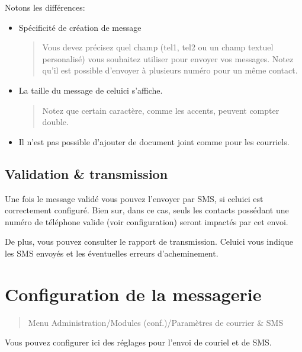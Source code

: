 \documentclass[letterpaper,10pt,french]{sphinxmanual}
\begin{document}
Notons les différences:
\begin{itemize}
\item {} 
Spécificité de création de message
\begin{quote}

Vous devez précisez quel champ (tel1, tel2 ou un champ textuel personalisé) vous souhaitez utiliser pour envoyer vos messages.
Notez qu’il est possible d’envoyer à plusieurs numéro pour un même contact.
\end{quote}

\item {} 
La taille du message de celui\sphinxhyphen{}ci s’affiche.
\begin{quote}

Notez que certain caractère, comme les accents, peuvent compter double.
\end{quote}

\item {} 
Il n’est pas possible d’ajouter de document joint comme pour les courriels.

\end{itemize}


\subsection{Validation \& transmission}
\label{\detokenize{mailing/sms:validation-transmission}}
Une fois le message validé vous pouvez l’envoyer par SMS, si celui\sphinxhyphen{}ci est correctement configuré.
Bien sur, dans ce cas, seuls les contacts possédant une numéro de téléphone valide (voir configuration) seront impactés par cet envoi.

De plus, vous pouvez consulter le rapport de transmission.
Celui\sphinxhyphen{}ci vous indique les SMS envoyés et les éventuelles erreurs d’acheminement.


\section{Configuration de la messagerie}
\label{\detokenize{mailing/configuration:configuration-de-la-messagerie}}\label{\detokenize{mailing/configuration::doc}}\begin{quote}

Menu Administration/Modules (conf.)/Paramètres de courrier \& SMS
\end{quote}

Vous pouvez configurer ici des réglages pour l’envoi de couriel et de SMS.
\end{document}
